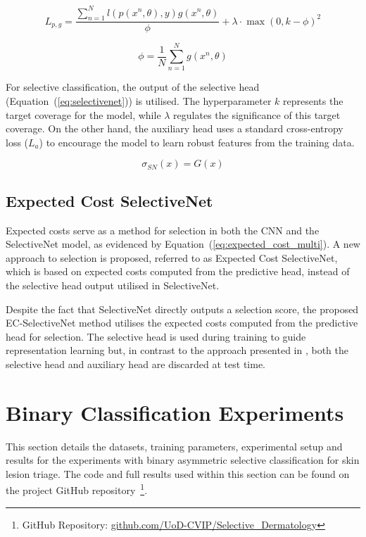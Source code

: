 \begin{equation}
	L_{p,g}=\frac{\sum^N_{n=1}l(p(x^n,\theta),y)g(x^n,\theta)}{\phi}+\lambda\cdot\max(0,k-\phi)^2
	\label{eq:selectivenet_loss}
\end{equation}

\begin{equation}
	\phi = \frac{1}{N}\sum^N_{n=1}g(x^n,\theta)
	\label{eq:coverage}
\end{equation}

\noindent For selective classification, the output of the selective head (Equation~(\ref{eq:selectivenet})) is utilised. The hyperparameter $k$ represents the target coverage for the model, while $\lambda$ regulates the significance of this target coverage. On the other hand, the auxiliary head uses a standard cross-entropy loss ($L_a$) to encourage the model to learn robust features from the training data. 

\begin{equation}
	\sigma_{SN}(x) = G(x)
	\label{eq:selectivenet}
\end{equation}

\subsection{Expected Cost SelectiveNet}
\label{subsec:ec_selectivenet}
Expected costs serve as a method for selection in both the CNN and the SelectiveNet model, as evidenced by Equation~(\ref{eq:expected_cost_multi}). A new approach to selection is proposed, referred to as Expected Cost SelectiveNet, which is based on expected costs computed from the predictive head, instead of the selective head output utilised in SelectiveNet.

Despite the fact that SelectiveNet directly outputs a selection score, the proposed EC-SelectiveNet method utilises the expected costs computed from the predictive head for selection. The selective head is used during training to guide representation learning but, in contrast to the approach presented in \cite{selective2019geifman}, both the selective head and auxiliary head are discarded at test time.



\section{Binary Classification Experiments}
\label{sec:selective_binary_experiment}
This section details the datasets, training parameters, experimental setup and results for the experiments with binary asymmetric selective classification for skin lesion triage. The code and full results used within this section can be found on the project GitHub repository~\footnote{GitHub Repository: \url{github.com/UoD-CVIP/Selective_Dermatology}}.

